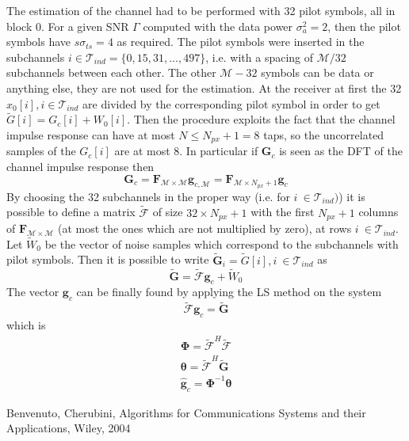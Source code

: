 \documentclass[10pt]{article}
\newcommand{\ofdM} {\mathcal{M}}
\newcommand{\DFTmat} {\mathcal{\boldsymbol{F}}}
\begin{document}
The estimation of the channel had to be performed with 32 pilot symbols, all in block $0$. For a given SNR $\Gamma$ computed with the data power $\sigma_a^2 = 2$, then the pilot symbols have $s\sigma_{ts} = 4$ as required. The pilot symbols were inserted in the subchannels $i \in \mathcal{T}_{ind} = \{ 0, 15, 31, \dots, 497 \}$, i.e. with a spacing of $\ofdM/32$ subchannels between each other. The other $\ofdM - 32$ symbols can be data or anything else, they are not used for the estimation. At the receiver at first the 32 $x_0[i], i \in \mathcal{T}_{ind}$ are divided by the corresponding pilot symbol in order to get $\tilde{G}[i] = G_c[i] + W_0[i]$. Then the procedure exploits the fact that the channel impulse response can have at most $N \le N_{px} + 1 = 8$ taps, so the uncorrelated samples of the $G_c[i]$ are at most 8. In particular if $\mathbf{G}_c$ is seen as the DFT of the channel impulse response then
\begin{equation}
	\mathbf{G}_c = \DFTmat_{\ofdM \times \ofdM} \mathbf{g}_{c,\ofdM} = \DFTmat_{\ofdM \times N_{px} + 1} \mathbf{g}_c
\end{equation}
By choosing the 32 subchannels in the proper way (i.e. for $ i\ \in \mathcal{T}_{ind}) $) it is possible to define a matrix $\boldsymbol{\tilde{\mathcal{F}}}$ of size $32 \times N_{px} + 1$ with the first $N_{px} + 1$ columns of $\DFTmat_{\ofdM \times \ofdM}$ (at most the ones which are not multiplied by zero), at rows $ i\ \in \mathcal{T}_{ind} $. Let $\tilde{W}_0$ be the vector of noise samples which correspond to the subchannels with pilot symbols. Then it is possible to write $\mathbf{\tilde{G}}_i = \tilde{G}[i], i\ \in \mathcal{T}_{ind}$ as
\begin{equation}
	\mathbf{\tilde{G}} = \boldsymbol{\tilde{\mathcal{F}}}\mathbf{g}_{c} + \tilde{W}_0
\end{equation}
The vector $\mathbf{g}_{c}$ can be finally found by applying the LS method on the system
\begin{equation}
	\boldsymbol{\tilde{\mathcal{F}}}\mathbf{g}_{c} = \mathbf{\tilde{G}}
\end{equation}
which is
\begin{eqnarray}
	\boldsymbol{\Phi} = \boldsymbol{\tilde{\mathcal{F}}}^H \boldsymbol{\tilde{\mathcal{F}}} \\
	\boldsymbol{\theta} = \boldsymbol{\tilde{\mathcal{F}}}^H \mathbf{\tilde{G}} \\ %
	\hat{\mathbf{g}}_{c} = \boldsymbol{\Phi}^{-1} \boldsymbol{\theta} 
\end{eqnarray}


\begin{thebibliography}{10}

Benvenuto, Cherubini, Algorithms for Communications Systems and their Applications, Wiley, 2004

\end{thebibliography}
\end{document}
